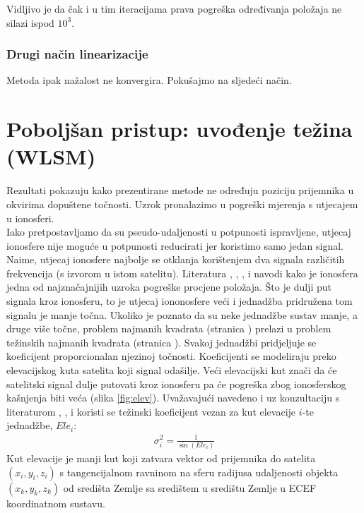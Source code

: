\documentclass[a4paper,twoside,12pt]{memoir} %
\begin{document}
Vidljivo je da čak i u tim iteracijama
prava pogreška određivanja položaja ne silazi ispod $10^3$.

\subsubsection{Drugi način linearizacije}
Metoda ipak nažalost ne konvergira. Pokušajmo na sljedeći način.

\section{Poboljšan pristup: uvođenje težina (WLSM)}\label{sec:algTezine}%
Rezultati pokazuju kako prezentirane metode ne određuju poziciju prijemnika u okvirima dopuštene točnosti.
Uzrok pronalazimo u pogreški mjerenja s utjecajem u ionosferi.\\
Iako pretpostavljamo da su pseudo-udaljenosti u potpunosti ispravljene, utjecaj ionosfere nije moguće u potpunosti reducirati jer koristimo samo jedan signal.
Naime, utjecaj ionosfere najbolje se otklanja korištenjem dva signala različitih frekvencija (s izvorom u istom satelitu). 
Literatura \cite{ref:4}, \cite{ref:9}, \cite{ref:10}, \cite{ref:38} i
\cite{ref:34} navodi kako je ionosfera jedna od najznačajnijih uzroka pogreške
procjene položaja.
Što je dulji put signala kroz ionosferu, to je utjecaj iononosfere veći i jednadžba pridružena tom signalu
je manje točna. Ukoliko je poznato da su neke jednadžbe sustav manje, a druge više točne, problem najmanih kvadrata
(stranica \pageref{code:iterLSM}) prelazi u problem težinskih najmanih kvadrata (stranica \pageref{code:iterLSMW}).
Svakoj jednadžbi pridjeljuje se koeficijent proporcionalan njezinoj točnosti.
Koeficijenti se modeliraju preko elevacijskog kuta satelita koji signal odašilje.
Veći elevacijski kut znači da će satelitski signal dulje putovati kroz ionosferu pa će pogreška
zbog ionosferskog kašnjenja biti veća (slika \ref{fig:elev}).
Uvažavajući navedeno i uz konzultaciju s literaturom \cite{ref:13}, \cite{ref:34},
\cite{ref:45} i \cite{ref:25} koristi se težinski koeficijent vezan za kut elevacije $i$-te jednadžbe, $Ele_i$:
\begin{align}\label{eq:elevationTezine1}
\sigma^2_i = \frac{1}{ \sin ( Ele_i ) }
\end{align}
Kut elevacije je manji kut koji zatvara vektor od prijemnika do satelita $(x_i,y_i,z_i)$ s tangencijalnom ravninom na sferu radijusa udaljenosti objekta $(x_k,y_k,z_k)$ od središta Zemlje sa središtem u središtu Zemlje u ECEF koordinatnom sustavu.
\end{document}
